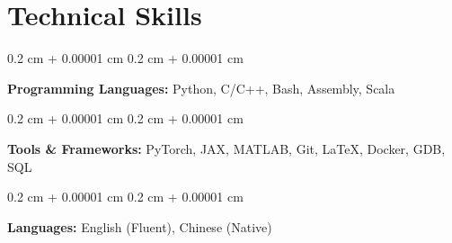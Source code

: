 \documentclass[11pt, letterpaper]{article}
\newenvironment{onecolentry}{
    \begin{adjustwidth}{
        0.2 cm + 0.00001 cm
    }{
        0.2 cm + 0.00001 cm
    }
}{
    \end{adjustwidth}
} %
\begin{document}
\section{Technical Skills}

\begin{onecolentry}
    \textbf{Programming Languages:} Python, C/C++, Bash, Assembly, Scala
\end{onecolentry}

\vspace{0.2 cm}

\begin{onecolentry}
    \textbf{Tools \& Frameworks:} PyTorch, JAX, MATLAB, Git, LaTeX, Docker, GDB, SQL
\end{onecolentry}

\vspace{0.2 cm}

\begin{onecolentry}
    \textbf{Languages:} English (Fluent), Chinese (Native)
\end{onecolentry}

    
\end{document}
